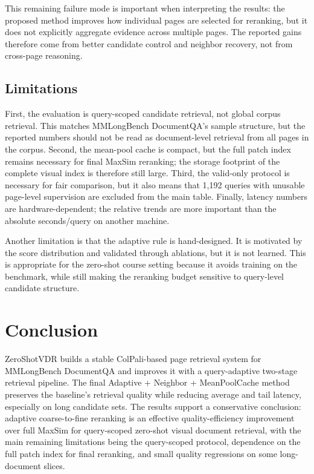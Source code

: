 \documentclass[11pt]{article}
\begin{document}
This remaining failure mode is important when interpreting the results: the proposed method improves how individual pages are selected for reranking, but it does not explicitly aggregate evidence across multiple pages. The reported gains therefore come from better candidate control and neighbor recovery, not from cross-page reasoning.

\subsection{Limitations}

First, the evaluation is query-scoped candidate retrieval, not global corpus retrieval. This matches MMLongBench DocumentQA's sample structure, but the reported numbers should not be read as document-level retrieval from all pages in the corpus. Second, the mean-pool cache is compact, but the full patch index remains necessary for final MaxSim reranking; the storage footprint of the complete visual index is therefore still large. Third, the valid-only protocol is necessary for fair comparison, but it also means that 1,192 queries with unusable page-level supervision are excluded from the main table. Finally, latency numbers are hardware-dependent; the relative trends are more important than the absolute seconds/query on another machine.

Another limitation is that the adaptive rule is hand-designed. It is motivated by the score distribution and validated through ablations, but it is not learned. This is appropriate for the zero-shot course setting because it avoids training on the benchmark, while still making the reranking budget sensitive to query-level candidate structure.

\section{Conclusion}

ZeroShotVDR builds a stable ColPali-based page retrieval system for MMLongBench DocumentQA and improves it with a query-adaptive two-stage retrieval pipeline. The final Adaptive + Neighbor + MeanPoolCache method preserves the baseline's retrieval quality while reducing average and tail latency, especially on long candidate sets. The results support a conservative conclusion: adaptive coarse-to-fine reranking is an effective quality-efficiency improvement over full MaxSim for query-scoped zero-shot visual document retrieval, with the main remaining limitations being the query-scoped protocol, dependence on the full patch index for final reranking, and small quality regressions on some long-document slices.
\end{document}
